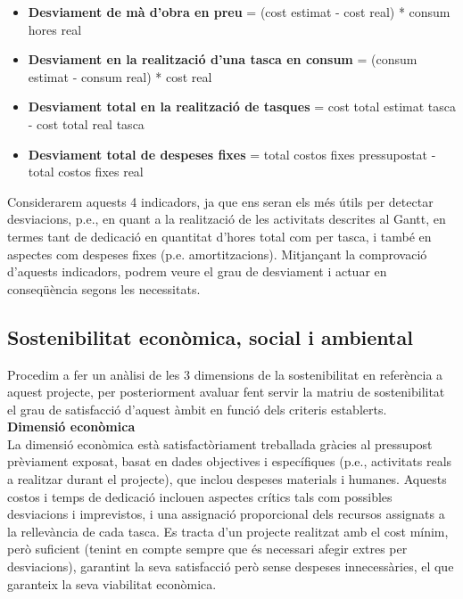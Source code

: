 \begin{itemize}
\item \textbf{Desviament de mà d’obra en preu} = (cost estimat - cost real) * consum hores real
\item \textbf{Desviament en la realització d’una tasca en consum} = (consum estimat - consum real) * cost real
\item \textbf{Desviament total en la realització de tasques} = cost total estimat tasca - cost total real tasca
\item \textbf{Desviament total de despeses fixes} = total costos fixes pressupostat - total costos fixes real
\end{itemize}

Considerarem aquests 4 indicadors, ja que ens seran els més útils per detectar desviacions, p.e., en quant a la realització de les activitats descrites al Gantt, en termes tant de dedicació en quantitat d’hores total com per tasca, i també en aspectes com despeses fixes (p.e. amortitzacions). Mitjançant la comprovació d’aquests indicadors, podrem veure el grau de desviament i actuar en conseqüència segons les necessitats. 

\subsection{Sostenibilitat econòmica, social i ambiental}

Procedim a fer un anàlisi de les 3 dimensions de la sostenibilitat en referència a aquest projecte, per posteriorment avaluar fent servir la matriu de sostenibilitat el grau de satisfacció d’aquest àmbit en funció dels criteris establerts.\\

\noindent \textbf{\large Dimensió econòmica}\\

\noindent La dimensió econòmica està satisfactòriament treballada gràcies al pressupost prèviament exposat, basat en dades objectives i específiques (p.e., activitats reals a realitzar durant el projecte), que inclou despeses materials i humanes. Aquests costos i temps de dedicació inclouen aspectes crítics tals com possibles desviacions i imprevistos, i una assignació proporcional dels recursos assignats a la rellevància de cada tasca. Es tracta d’un projecte realitzat amb el cost mínim, però suficient (tenint en compte sempre que és necessari afegir extres per desviacions), garantint la seva satisfacció però sense despeses innecessàries, el que garanteix la seva viabilitat econòmica.\\

